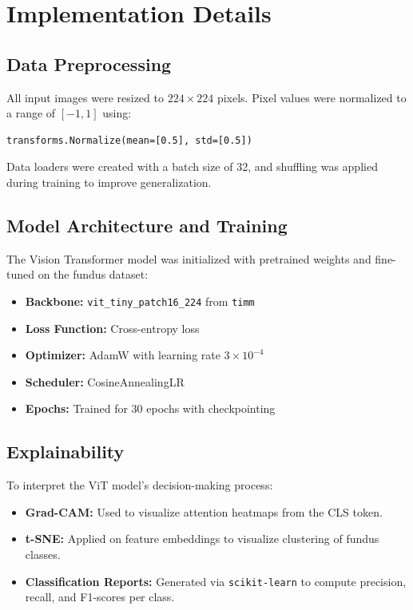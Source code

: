 \documentclass[a4paper,12pt]{report}
\begin{document}
\section{Implementation Details}

\subsection{Data Preprocessing}

All input images were resized to $224 \times 224$ pixels. Pixel values were normalized to a range of $[-1, 1]$ using:
\begin{verbatim}
transforms.Normalize(mean=[0.5], std=[0.5])
\end{verbatim}

Data loaders were created with a batch size of 32, and shuffling was applied during training to improve generalization.

\subsection{Model Architecture and Training}

The Vision Transformer model was initialized with pretrained weights and fine-tuned on the fundus dataset:
\begin{itemize}
    \item \textbf{Backbone:} \texttt{vit\_tiny\_patch16\_224} from \texttt{timm}
    \item \textbf{Loss Function:} Cross-entropy loss
    \item \textbf{Optimizer:} AdamW with learning rate $3 \times 10^{-4}$
    \item \textbf{Scheduler:} CosineAnnealingLR
    \item \textbf{Epochs:} Trained for 30 epochs with checkpointing
\end{itemize}

\subsection{Explainability}

To interpret the ViT model's decision-making process:
\begin{itemize}
    \item \textbf{Grad-CAM:} Used to visualize attention heatmaps from the CLS token.
    \item \textbf{t-SNE:} Applied on feature embeddings to visualize clustering of fundus classes.
    \item \textbf{Classification Reports:} Generated via \texttt{scikit-learn} to compute precision, recall, and F1-scores per class.
\end{itemize}
\end{document}
